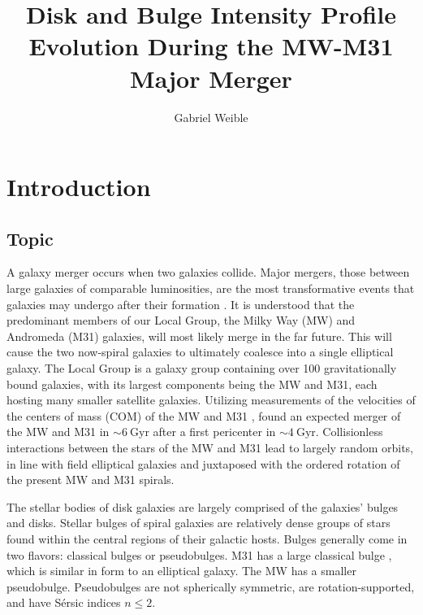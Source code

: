 \documentclass[twocolumn]{aastex631}
\begin{document}
\title{Disk and Bulge Intensity Profile Evolution During the MW-M31 Major Merger}
\author{Gabriel Weible}



\section{Introduction}

\subsection{Topic}
A galaxy merger occurs when two galaxies collide. Major mergers, those between large galaxies of comparable luminosities, are the most transformative events that galaxies may undergo after their formation \citep{lambas2012}. It is understood that the predominant members of our Local Group, the Milky Way (MW) and Andromeda (M31) galaxies, will most likely merge in the far future. This will cause the two now-spiral galaxies to ultimately coalesce into a single elliptical galaxy. The Local Group is a galaxy group containing over 100 gravitationally bound galaxies, with its largest components being the MW and M31, each hosting many smaller satellite galaxies. Utilizing measurements of the velocities of the centers of mass (COM) of the MW and M31 \citep{paper2}, \cite{paper3} found an expected merger of the MW and M31 in ${\sim}6 \ \mathrm{Gyr}$ after a first pericenter in ${\sim}4 \ \mathrm{Gyr}$. Collisionless interactions between the stars of the MW and M31 lead to largely random orbits, in line with field elliptical galaxies and juxtaposed with the ordered rotation of the present MW and M31 spirals.

The stellar bodies of disk galaxies are largely comprised of the galaxies' bulges and disks. Stellar bulges of spiral galaxies are relatively dense groups of stars found within the central regions of their galactic hosts. Bulges generally come in two flavors: classical bulges or pseudobulges. M31 has a large classical bulge \citep{kormendy2010}, which is similar in form to an elliptical galaxy. The MW has a smaller pseudobulge. Pseudobulges are not spherically symmetric, are rotation-supported, and have S\'{e}rsic indices $n \le 2$.
\end{document}
